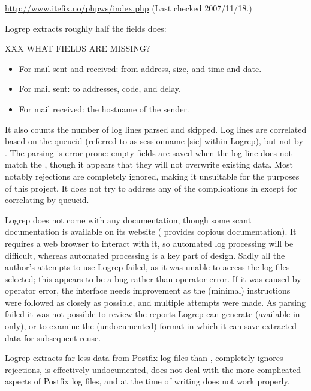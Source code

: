 \noindent{}\url{http://www.itefix.no/phpws/index.php} \newline{}
(Last checked 2007/11/18.)

Logrep extracts roughly half the fields \parsername{} does:

XXX WHAT FIELDS ARE MISSING\@?

\begin{itemize}

    \item For mail sent and received: from address, size, and time and
        date.

    \item For mail sent: to addresses, \SMTP{} code, and delay.

    \item For mail received: the hostname of the sender.

\end{itemize}

It also counts the number of log lines parsed and skipped.  Log lines are
correlated based on the queueid (referred to as sessionname [sic] within
Logrep), but not by \pid{}.  The parsing is error prone: empty fields are
saved when the log line does not match the \regex{}, though it appears that
they will not overwrite existing data.  Most notably rejections are
completely ignored, making it unsuitable for the purposes of this project.
It does not try to address any of the complications in
 except for correlating by queueid.

Logrep does not come with any documentation, though some scant
documentation is available on its website (\parsername{} provides copious
documentation).  It requires a web browser to interact with it, so
automated log processing will be difficult, whereas automated processing is
a key part of \parsernames{} design.  Sadly all the author's attempts to
use Logrep failed, as it was unable to access the log files selected; this
appears to be a bug rather than operator error.  If it was caused by
operator error, the interface needs improvement as the (minimal)
instructions were followed as closely as possible, and multiple attempts
were made.  As parsing failed it was not possible to review the reports
Logrep can generate (available in \HTML{} only), or to examine the
(undocumented) format in which it can save extracted data for subsequent
reuse.

Logrep extracts far less data from Postfix log files than \parsername{},
completely ignores rejections, is effectively undocumented, does not deal
with the more complicated aspects of Postfix log files, and at the time of
writing does not work properly.

